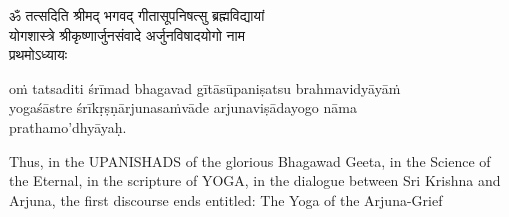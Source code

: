 \begin{gitaverse}
ॐ तत्सदिति श्रीमद् भगवद् गीतासूपनिषत्सु ब्रह्मविद्यायां \\
योगशास्त्रे श्रीकृष्णार्जुनसंवादे अर्जुनविषादयोगो नाम \\
प्रथमोऽध्यायः
\end{gitaverse}

\begin{transliteration}
oṁ tatsaditi śrīmad bhagavad gītāsūpaniṣatsu brahmavidyāyāṁ \\
yogaśāstre śrīkṛṣṇārjunasaṁvāde arjunaviṣādayogo nāma \\
prathamo'dhyāyaḥ.
\end{transliteration}

Thus, in the UPANISHADS of the glorious Bhagawad Geeta, in the Science of the
Eternal, in the scripture of YOGA, in the dialogue between Sri Krishna and
Arjuna, the first discourse ends entitled: The Yoga of the Arjuna-Grief
